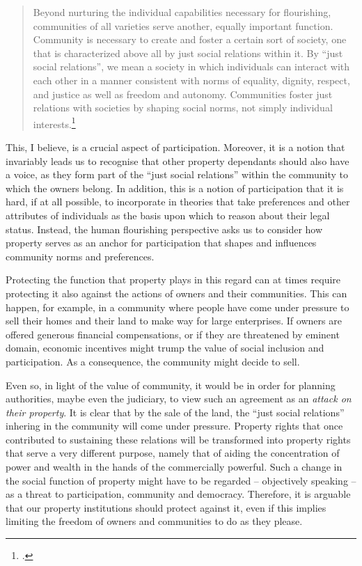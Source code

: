 \begin{quote}
Beyond nurturing the individual capabilities necessary for flourishing, communities of all varieties serve another, equally important function. Community is necessary to create and foster a certain sort of society, one that is characterized above all by just social relations within it. By ``just social relations'', we mean a society in which individuals can interact with each other in a manner consistent with norms of equality, dignity, respect, and justice as well as freedom and autonomy. Communities foster just relations with societies by shaping social norms, not simply individual interests.\footcite[140]{alexander09}
\end{quote}

This, I believe, is a crucial aspect of participation. Moreover, it is a notion that invariably leads us to recognise that other property dependants should also have a voice, as they form part of the ``just social relations'' within the community to which the owners belong. In addition, this is a notion of participation that it is hard, if at all possible, to incorporate in theories that take preferences and other attributes of individuals as the basis upon which to reason about their legal status. Instead, the human flourishing perspective asks us to consider how property serves as an anchor for participation that shapes and influences community norms and preferences.

Protecting the function that property plays in this regard can at times require protecting it also against the actions of owners and their communities. This can happen, for example, in a community where people have come under pressure to sell their homes and their land to make way for large enterprises. If owners are offered generous financial compensations, or if they are threatened by eminent domain, economic incentives might trump the value of social inclusion and participation. As a consequence, the community might decide to sell.

Even so, in light of the value of community, it would be in order for planning authorities, maybe even the judiciary, to view such an agreement as an {\it attack on their property}. It is clear that by the sale of the land, the ``just social relations'' inhering in the community will come under pressure. Property rights that once contributed to sustaining these relations will be transformed into property rights that serve a very different purpose, namely that of aiding the concentration of power and wealth in the hands of the commercially powerful. Such a change in the social function of property might have to be regarded -- objectively speaking -- as a threat to participation, community and democracy. Therefore, it is arguable that our property institutions should protect against it, even if this implies limiting the freedom of owners and communities to do as they please.

